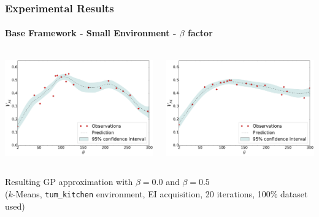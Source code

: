 \begin{frame}
	\frametitle{Experimental Results}
	\framesubtitle{Base Framework - Small Environment - $\beta$ factor}
	\vspace{10pt}
	\begin{columns}
		\begin{column}{0.5\textwidth}
			\includegraphics[width=\linewidth]{../../figures/plots/tum_base/plot_b_00__alg_kmeans_pct_100_acq_ei}
		\end{column}
		\begin{column}{0.5\textwidth}
			\includegraphics[width=\linewidth]{../../figures/plots/tum_base/plot_b_05__alg_kmeans_pct_100_acq_ei}
		\end{column}
	\end{columns}
	\begin{center}
		\footnotesize
		Resulting GP approximation with $\beta = 0.0$ and $\beta = 0.5$\\
		($k$-Means, \texttt{tum\_kitchen} environment, EI acquisition, 20 iterations, 100\% dataset used)
	\end{center}
\end{frame}

